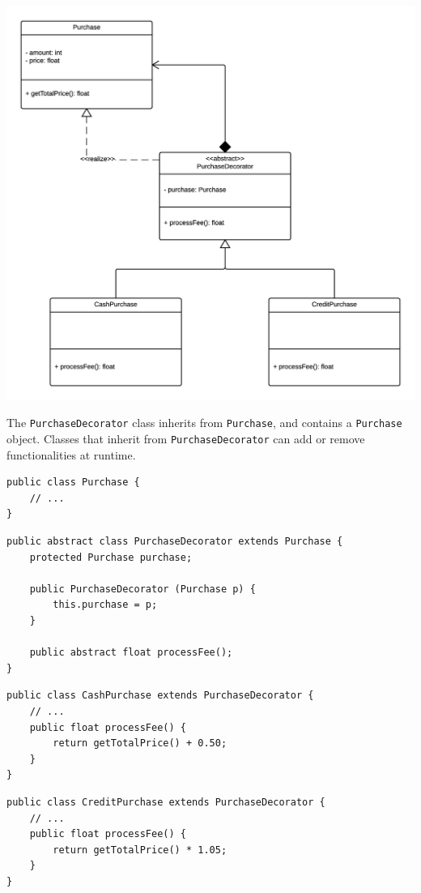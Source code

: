 \documentclass[11pt, a4paper]{article}
\newcommand{\settextlisting}{\lstset{ basicstyle=\small\ttfamily }}
\newcommand{\setcodelisting}{\lstset{ basicstyle=\footnotesize\ttfamily }}
\begin{document}
\includegraphics[width=\textwidth]{DecoratorPattern.png}

\medskip
\settextlisting
The \lstinline|PurchaseDecorator| class inherits from \lstinline|Purchase|, and contains a \lstinline|Purchase| object.
Classes that inherit from \lstinline|PurchaseDecorator| can add or remove functionalities at runtime.

\bigskip
\setcodelisting
\begin{lstlisting}
public class Purchase {
	// ...
}
\end{lstlisting}


\begin{lstlisting}
public abstract class PurchaseDecorator extends Purchase {
	protected Purchase purchase;
	
	public PurchaseDecorator (Purchase p) {
		this.purchase = p;
	}
	
	public abstract float processFee();
}
\end{lstlisting}


\begin{lstlisting}
public class CashPurchase extends PurchaseDecorator {
	// ...
	public float processFee() {
		return getTotalPrice() + 0.50;
	}
}
\end{lstlisting}


\begin{lstlisting}
public class CreditPurchase extends PurchaseDecorator {
	// ...
	public float processFee() {
		return getTotalPrice() * 1.05;
	}
}
\end{lstlisting}
\end{document}

